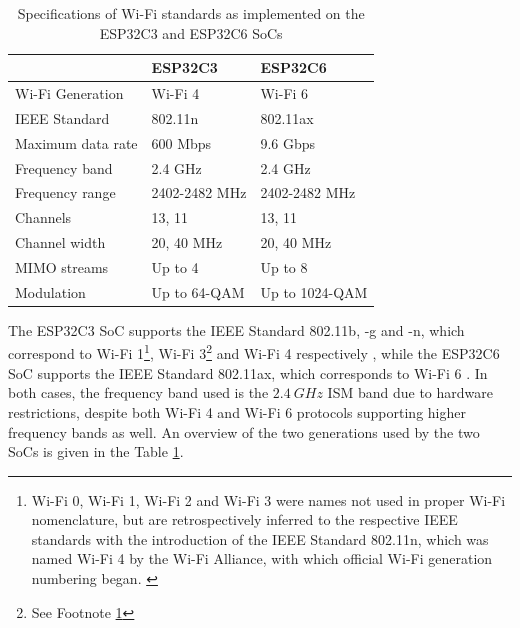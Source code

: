 \begin{table}[H]
    \centering
    \begin{tabular}{|l|l|l|}
        \hline
        & \textbf{ESP32C3} & \textbf{ESP32C6} \\\hline
        Wi-Fi Generation & Wi-Fi 4 & Wi-Fi 6 \\\hline
        IEEE Standard & 802.11n & 802.11ax \\\hline
        Maximum data rate & 600 Mbps & 9.6 Gbps \\\hline
        Frequency band & 2.4 GHz & 2.4 GHz \\\hline
        Frequency range & 2402-2482 MHz & 2402-2482 MHz \\\hline
        Channels & 13, 11 & 13, 11 \\\hline
        Channel width & 20, 40 MHz & 20, 40 MHz \\\hline
        MIMO streams & Up to 4 & Up to 8 \\\hline
        Modulation & Up to 64-QAM & Up to 1024-QAM \\\hline
    \end{tabular}
    \vspace{\ftspace}
    \caption{Specifications of Wi-Fi standards as implemented on the ESP32C3 and ESP32C6 SoCs \citep{noauthor_ieee_2009, noauthor_ieee_2021}}
    \label{tab:esp_wifi}
\end{table}

The ESP32C3 SoC supports the IEEE Standard 802.11b, -g and -n, which correspond to Wi-Fi 1\footnote{\label{note:wifi_name}Wi-Fi 0, Wi-Fi 1, Wi-Fi 2 and Wi-Fi 3 were names not used in proper Wi-Fi nomenclature, but are retrospectively inferred to the respective IEEE standards with the introduction of the IEEE Standard 802.11n, which was named Wi-Fi 4 by the Wi-Fi Alliance, with which official Wi-Fi generation numbering began. \citep{wi-fi_alliance_generational_2023}}, Wi-Fi 3\footnote{See Footnote \ref{note:wifi_name}} and Wi-Fi 4 respectively \citep{seeed_studio_seeed_2024-2, espressif_systems_esp32-c3_2024, wi-fi_alliance_generational_2023, noauthor_ieee_2000,noauthor_ieee_2003, noauthor_ieee_2009}, while the ESP32C6 SoC supports the IEEE Standard 802.11ax, which corresponds to Wi-Fi 6 \citep{seeed_studio_seeed_2024-1, espressif_systems_esp32-c6_2024, wi-fi_alliance_generational_2023, noauthor_ieee_2021}. In both cases, the frequency band used is the $2.4\ GHz$ ISM band due to hardware restrictions, despite both Wi-Fi 4 and Wi-Fi 6 protocols supporting higher frequency bands as well. An overview of the two generations used by the two SoCs is given in the Table \ref{tab:esp_wifi}.\\

